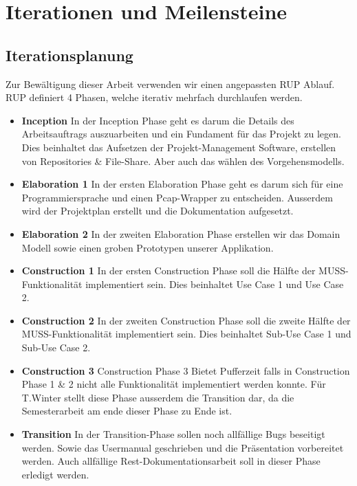 \section{Iterationen und Meilensteine}
\label{sec:Iterationen und Meilensteine}

\subsection{Iterationsplanung}
Zur Bewältigung dieser Arbeit verwenden wir einen angepassten \acl{RUP} Ablauf. \acs{RUP} definiert 4 Phasen, welche iterativ mehrfach durchlaufen werden.

\begin{itemize}
  \item \textbf{Inception} \newline In der Inception Phase geht es darum die Details des Arbeitsauftrags auszuarbeiten und ein Fundament für das Projekt zu legen. Dies beinhaltet das Aufsetzen der Projekt-Management Software, erstellen von Repositories \& File-Share. Aber auch das wählen des Vorgehensmodells.
  \item \textbf{Elaboration 1} \newline In der ersten Elaboration Phase geht es darum sich für eine Programmiersprache und einen Pcap-Wrapper zu entscheiden. Ausserdem wird der Projektplan erstellt und die Dokumentation aufgesetzt.
  \item \textbf{Elaboration 2} \newline In der zweiten Elaboration Phase erstellen wir das Domain Modell sowie einen groben Prototypen unserer Applikation.
  \item \textbf{Construction 1} \newline In der ersten Construction Phase soll die Hälfte der MUSS-Funktionalität implementiert sein. Dies beinhaltet Use Case 1 und Use Case 2.
  \item \textbf{Construction 2} \newline In der zweiten Construction Phase soll die zweite Hälfte der MUSS-Funktionalität implementiert sein. Dies beinhaltet Sub-Use Case 1 und Sub-Use Case 2.
  \item \textbf{Construction 3} \newline Construction Phase 3 Bietet Pufferzeit falls in Construction Phase 1 \& 2 nicht alle Funktionalität implementiert werden konnte. Für T.Winter stellt diese Phase ausserdem die Transition dar, da die Semesterarbeit am ende dieser Phase zu Ende ist.
  \item \textbf{Transition} \newline In der Transition-Phase sollen noch allfällige Bugs beseitigt werden. Sowie das Usermanual geschrieben und die Präsentation vorbereitet werden. Auch allfällige Rest-Dokumentationsarbeit soll in dieser Phase erledigt werden.
\end{itemize}

